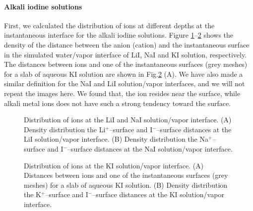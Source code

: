 \paragraph{Alkali iodine solutions}
First, we calculated the distribution of ions at different depths at the instantaneous interface for the alkali iodine solutions.
Figure \ref{fig:prob_dist_Li_surf_I_surf}--\ref{fig:prob_dist_K_surf_I_surf} shows the density of the distance between the anion (cation) 
and the instantaneous surface in the simulated water/vapor interface of LiI, NaI and KI solution, respectively. 
The distances between ions and one of the instantaneous surfaces (grey meshes) 
for a slab of aqueous KI solution are shown in Fig.\thinspace\ref{fig:prob_dist_K_surf_I_surf} (A). 
We have also made a similar definition for the NaI and LiI solution/vapor interfaces, and we will not repeat the images here.
We found that, 
the \I ion resides near the surface, while alkali metal ions does not have such a strong tendency toward the surface. 
\begin{figure}[H]%
    \centering
    \qquad
    \caption{
Distribution of ions at the LiI and NaI solution/vapor interface.   
(A) 
Density distribution the Li$^+$--surface and I$^-$--surface distances at the LiI solution/vapor interface. 
(B)
Density distribution the Na$^+$--surface and I$^-$--surface distances at the NaI solution/vapor interface. 
}%
    \label{fig:prob_dist_Li_surf_I_surf}%
\end{figure}
\begin{figure}[H]%
    \centering
    \qquad
    \caption{
Distribution of ions at the KI solution/vapor interface.   
(A) 
Distances between ions and one of the instantaneous surfaces (grey meshes) for a slab of aqueous KI solution. 
(B)
Density distribution the K$^+$--surface and I$^-$--surface distances at the KI solution/vapor interface. 
}%
    \label{fig:prob_dist_K_surf_I_surf}%
\end{figure}

